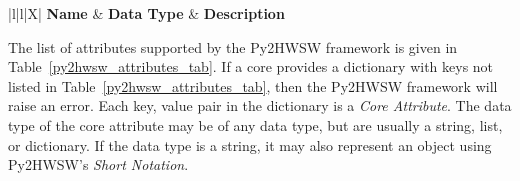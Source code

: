 %
%

{
\setlength{\LTcapwidth}{\linewidth} %
\begin{xltabular}{\textwidth}{|l|l|X|}
  \hline
  {\bf Name} & {\bf Data Type} & {\bf Description}  \\ \hline \hline
  \endfirsthead
  \hline
  \caption{Supported Py2HWSW attributes in the \textbf{Core Dictionary}. The \textit{Data Type} column specifies the type of internal object that the Py2HWSW will convert the attribute's value to (usually the user inputs a string, list, or dictionary value and then py2 converts it to an internal object).}
  \endlastfoot

  

  \label{py2hwsw_attributes_tab}
\end{xltabular}
}

The list of attributes supported by the Py2HWSW framework is given in Table~\ref{py2hwsw_attributes_tab}.
If a core provides a dictionary with keys not listed in Table~\ref{py2hwsw_attributes_tab}, then the Py2HWSW framework will raise an error.
Each key, value pair in the dictionary is a \textit{Core Attribute}.
The data type of the core attribute may be of any data type, but are usually a string, list, or dictionary.
If the data type is a string, it may also represent an object using Py2HWSW's \textit{Short Notation}.
